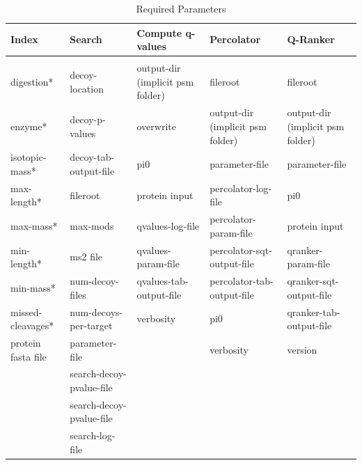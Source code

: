 \documentclass{article}
\begin{document}
\begin{table}
\caption{Required Parameters}
\begin{tabular}{lllll}
\textbf{Index}&\textbf{Search}&\textbf{Compute q-values}&\textbf{Percolator} &\textbf{Q-Ranker} \\
\hline \\
digestion*            &decoy-location                    &output-dir (implicit psm folder) &fileroot                         &fileroot                         \\
enzyme*               &decoy-p-values                    &overwrite                        &output-dir (implicit psm folder) &output-dir (implicit psm folder) \\
isotopic-mass*        &decoy-tab-output-file             &pi0                              &parameter-file                   &parameter-file                   \\
max-length*           &fileroot                          &protein input                    &percolator-log-file              &pi0                              \\
max-mass*             &max-mods                          &qvalues-log-file                 &percolator-param-file            &protein input                    \\
min-length*           &ms2 file                          &qvalues-param-file               &percolator-sqt-output-file       &qranker-param-file               \\
min-mass*             &num-decoy-files                   &qvalues-tab-output-file          &percolator-tab-output-file       &qranker-sqt-output-file          \\
missed-cleavages*     &num-decoys-per-target             &verbosity                        &pi0                              &qranker-tab-output-file          \\
protein fasta file   &parameter-file                    &                                 &verbosity                        &version                          \\
                     &search-decoy-pvalue-file          &                                 &                                 &                                 \\
                     &search-decoy-pvalue-file          &                                 &                                 &                                 \\
                     &search-log-file                   &                                 &                                 &                                 \\

\end{tabular}
\end{table}
\end{document}
